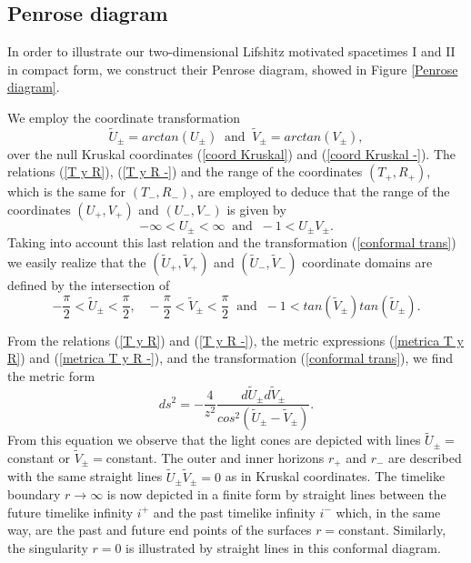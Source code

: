 \documentclass[sn-mathphys,Numbered]{sn-jnl}%
\theoremstyle{thmstyleone}%
\theoremstyle{thmstyletwo}%
\theoremstyle{thmstylethree}%
\begin{document}
\subsection{Penrose diagram}

In order to illustrate our two-dimensional Lifshitz motivated spacetimes I and II in compact form, we construct their Penrose diagram, showed in Figure \ref{Penrose diagram}. 

We employ the coordinate transformation 
%
\begin{equation} \label{conformal trans}
    \tilde{U}_{\pm}=arctan(U_{\pm})\;\; \text{and} \; 
    \; \tilde{V}_{\pm} = arctan(V_{\pm}),
\end{equation}
% 
over the null Kruskal coordinates (\ref{coord Kruskal}) and (\ref{coord Kruskal -}). The relations (\ref{T y R}), (\ref{T y R -}) and the range of the coordinates $\left(T_+,R_+\right)$, which is the same for $\left(T_-,R_-\right)$, are employed to deduce that the range of the coordinates $\left(U_+,V_+\right)$ and $\left(U_-,V_-\right)$ is given by
%
\begin{equation}
    -\infty < U_{\pm} < \infty \;\; \text{and} \;\; -1 < U_{\pm} V_{\pm}.
\end{equation}
%
Taking into account this last relation and the transformation (\ref{conformal trans}) we easily realize that the $\left(\tilde{U}_+,\tilde{V}_+\right)$ and $\left(\tilde{U}_-,\tilde{V}_-\right)$ coordinate domains are defined by the intersection of
%
\begin{equation}
    -\frac{\pi}{2} < \tilde{U}_{\pm} < \frac{\pi}{2}, \;\;\; -\frac{\pi}{2} < \tilde{V}_{\pm} < \frac{\pi}{2}  \;\;\text{and} 
    \;\; -1 < tan\left(\tilde{V}_{\pm} \right) tan\left(\tilde{U}_{\pm}\right).
\end{equation}
%

From the relations (\ref{T y R}) and (\ref{T y R -}), the metric expressions (\ref{metrica T y R}) and (\ref{metrica T y R -}), and the transformation (\ref{conformal trans}), we find the metric form
%
\begin{equation}
    ds^2= -\frac{4}{z^2} \frac{d \tilde{U}_{\pm} d\tilde{V}_{\pm}}{cos^2\left(\tilde{U}_{\pm}-\tilde{V}_{\pm}\right)}.
\end{equation}
From this equation we observe that the light cones are depicted with lines $\tilde{U}_{\pm}=$constant or $\tilde{V}_{\pm}=$constant. The outer and inner horizons $r_+$ and $r_-$ are described with the same straight lines $\tilde{U}_{\pm} \tilde{V}_{\pm}=0$ as in Kruskal coordinates. The timelike boundary $r\rightarrow \infty$ is now depicted in a finite form by straight lines between the future timelike infinity $i^+$ and the past timelike infinity $i^-$ which, in the same way, are the past and future end points of the surfaces $r=$constant. Similarly, the singularity $r=0$ is illustrated by straight lines in this conformal diagram.
\end{document}
